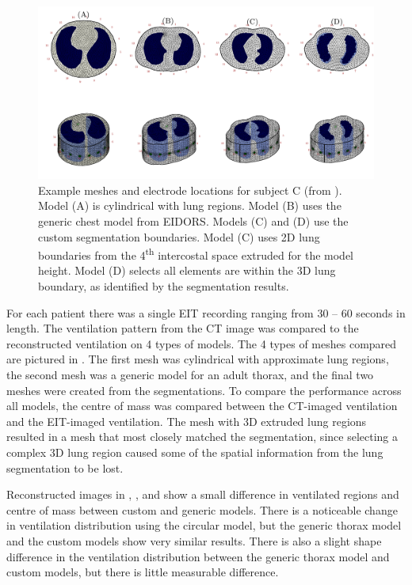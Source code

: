 \begin{figure}[H]
	\centering
	\includegraphics[width=\textwidth]{chapter5-CT_to_mesh/imgs/fem_models_PT04.pdf}
	\caption[Custom and generic meshes]{\label{fig:fem-results}%
	Example meshes and electrode locations for subject C (from ).
	Model (A) is cylindrical with lung regions. Model (B) uses the generic chest model from EIDORS. 
	Models (C) and (D) use the custom segmentation boundaries. Model (C) uses 2D lung boundaries 
	from the 4\textsuperscript{th} intercostal space extruded for the model height. Model (D) selects all elements
	are within the 3D lung boundary, as identified by the segmentation results.
	}
\end{figure}

For each patient there was a single EIT recording ranging from 30 -- 60 seconds 
in length.
The ventilation pattern 
from the CT image was compared to the reconstructed ventilation 
on 4 types of models.
The 4 types of meshes compared are pictured in . The first mesh was
cylindrical with approximate lung regions, the second mesh was a generic model 
for an adult thorax, and the final two meshes were created from the segmentations. 
To compare the performance across all models, the centre of mass  was 
compared between the CT-imaged ventilation and the EIT-imaged ventilation.
The mesh with 3D extruded lung regions resulted in a mesh that most closely matched 
the segmentation, since selecting a complex 3D lung region caused some of the
spatial information from the lung segmentation to be lost.

Reconstructed images in , 
,
 and
show a small difference in ventilated regions 
and centre of mass between custom and generic models. There is a 
noticeable change in ventilation distribution using the circular model, but the 
generic thorax model and the custom models show very similar results. 
There is also a slight shape difference in the ventilation distribution between the generic thorax model 
and custom models, but there is little measurable difference. 

